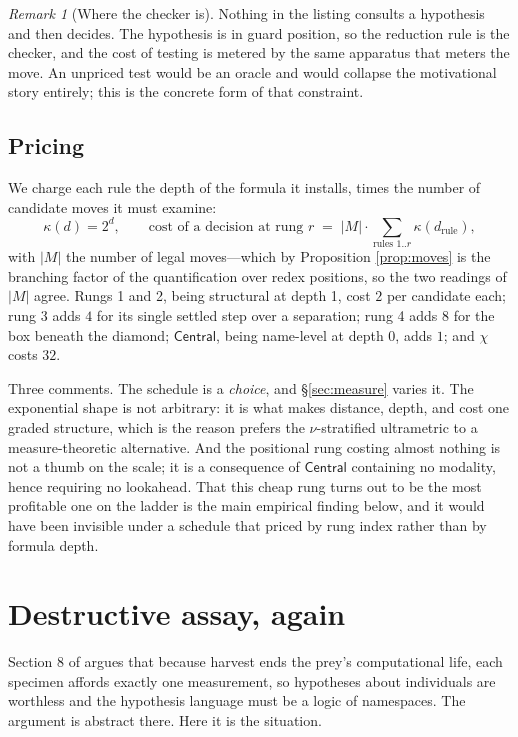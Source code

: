 \documentclass[11pt]{article}
\theoremstyle{definition}
\theoremstyle{plain}
\theoremstyle{remark}
\newtheorem{remark}[definition]{Remark}
\newcommand{\Ctr}{\mathsf{Central}}
\begin{document}
\begin{remark}[Where the checker is]
Nothing in the listing consults a hypothesis and then decides. The hypothesis is
in guard position, so the reduction rule is the checker, and the cost of testing
is metered by the same apparatus that meters the move. An unpriced test would be
an oracle and would collapse the motivational story entirely; this is the
concrete form of that constraint.
\end{remark}

\subsection{Pricing}\label{sec:price}

We charge each rule the depth of the formula it installs, times the number of
candidate moves it must examine:
\[
\kappa(d) = 2^{d}, \qquad
\text{cost of a decision at rung } r \;=\; |M| \cdot \!\!\sum_{\text{rules } 1..r}\!\! \kappa(d_{\text{rule}}) ,
\]
with $|M|$ the number of legal moves---which by Proposition \ref{prop:moves} is
the branching factor of the quantification over redex positions, so the two
readings of $|M|$ agree. Rungs 1 and 2, being structural at depth 1, cost $2$
per candidate each; rung 3 adds $4$ for its single settled step over a
separation; rung 4 adds $8$ for the box beneath the diamond; $\Ctr$, being
name-level at depth 0, adds $1$; and $\chi$ costs $32$.

Three comments. The schedule is a \emph{choice}, and \S\ref{sec:measure} varies
it. The exponential shape is not arbitrary: it is what makes distance, depth,
and cost one graded structure, which is the reason \cite{scientist} prefers the
$\nu$-stratified ultrametric to a measure-theoretic alternative. And the
positional rung costing almost nothing is not a thumb on the scale; it is a
consequence of $\Ctr$ containing no modality, hence requiring no lookahead. That
this cheap rung turns out to be the most profitable one on the ladder is the
main empirical finding below, and it would have been invisible under a schedule
that priced by rung index rather than by formula depth.

\section{Destructive assay, again}\label{sec:destructive}

Section 8 of \cite{scientist} argues that because harvest ends the prey's
computational life, each specimen affords exactly one measurement, so hypotheses
about individuals are worthless and the hypothesis language must be a logic of
namespaces. The argument is abstract there. Here it is the situation.
\end{document}
